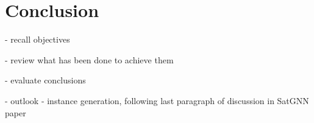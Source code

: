 % 

\part*{Conclusion}\label{conclusion}

- recall objectives

- review what has been done to achieve them

- evaluate conclusions

- outlook
    - instance generation, following last paragraph of discussion in SatGNN paper

